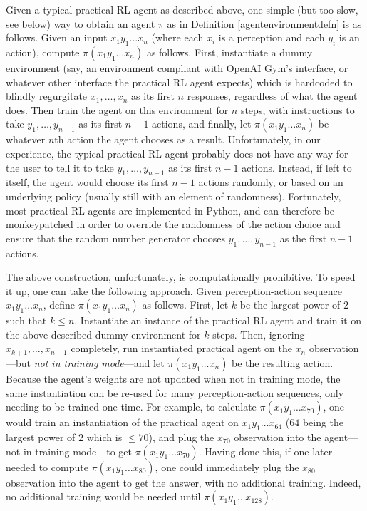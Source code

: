 \documentclass{article}
\begin{document}
Given a typical practical RL agent as described above, one simple
(but too slow, see below)
way to obtain an agent
$\pi$ as in Definition \ref{agentenvironmentdefn} is as follows.
Given an input $x_1y_1\ldots x_n$ (where each $x_i$ is a perception and each $y_i$ is an
action), compute $\pi(x_1y_1\ldots x_n)$ as follows. First, instantiate a dummy
environment (say, an environment compliant with OpenAI Gym's interface, or whatever other
interface the practical RL agent expects) which is hardcoded to blindly regurgitate
$x_1,\ldots,x_n$ as its first $n$ responses, regardless of what the agent does.
Then train the agent on this environment for $n$ steps, with instructions to
take $y_1,\ldots,y_{n-1}$ as its first $n-1$ actions, and finally, let
$\pi(x_1y_1\ldots x_n)$ be whatever $n$th action the agent chooses as a result.
Unfortunately, in our experience, the typical practical RL agent probably does not have
any way for the user to tell it to take $y_1,\ldots,y_{n-1}$ as its first $n-1$
actions. Instead, if left to itself, the agent would choose its first $n-1$ actions
randomly, or based on an underlying policy (usually still with an element of randomness).
Fortunately, most practical RL agents are implemented in Python, and can therefore
be monkeypatched in order to override the randomness of the action choice and ensure
that the random number generator chooses $y_1,\ldots,y_{n-1}$ as the first $n-1$
actions.

The above construction, unfortunately, is computationally prohibitive.
To speed it up, one can take the following approach.
Given perception-action sequence $x_1y_1\ldots x_n$,
define $\pi(x_1y_1\ldots x_n)$ as follows.
First, let $k$ be the largest power of $2$ such that $k\leq n$.
Instantiate an instance of the practical RL agent and train it on the
above-described dummy environment for $k$ steps.
Then, ignoring $x_{k+1},\ldots,x_{n-1}$ completely,
run instantiated practical agent on the $x_n$ observation---but
\emph{not in training mode}---and let
$\pi(x_1y_1\ldots x_n)$ be the resulting action.
Because the agent's weights are not updated when not in training mode,
the same instantiation can be re-used for many perception-action sequences,
only needing to be trained one time.
For example, to calculate $\pi(x_1y_1\ldots x_{70})$,
one would train an instantiation of the practical agent on
$x_1y_1\ldots x_{64}$ ($64$ being the largest power of $2$ which is $\leq 70$),
and plug the $x_{70}$ observation into the agent---not in training mode---to get
$\pi(x_1y_1\ldots x_{70})$.
Having done this, if one later needed to compute
$\pi(x_1y_1\ldots x_{80})$, one could immediately plug the $x_{80}$ observation into
the agent to get the answer, with no additional training. Indeed, no additional
training would be needed until $\pi(x_1y_1\ldots x_{128})$.
\end{document}
